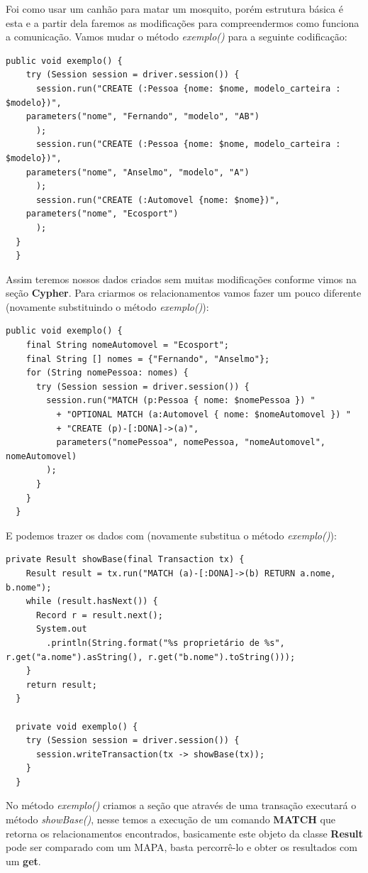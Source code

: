 Foi como usar um canhão para matar um mosquito, porém estrutura básica é esta e a partir dela faremos as modificações para compreendermos como funciona a comunicação. Vamos mudar o método \textit{exemplo()} para a seguinte codificação:
\begin{lstlisting}[]
  public void exemplo() {
    try (Session session = driver.session()) {
      session.run("CREATE (:Pessoa {nome: $nome, modelo_carteira : $modelo})", 
    parameters("nome", "Fernando", "modelo", "AB") 
      );
      session.run("CREATE (:Pessoa {nome: $nome, modelo_carteira : $modelo})", 
    parameters("nome", "Anselmo", "modelo", "A") 
      );
      session.run("CREATE (:Automovel {nome: $nome})", 
    parameters("nome", "Ecosport") 
      );
  }
  }
\end{lstlisting}

Assim teremos nossos dados criados sem muitas modificações conforme vimos na seção \textbf{Cypher}. Para criarmos os relacionamentos vamos fazer um pouco diferente (novamente substituindo o método \textit{exemplo()}):

\begin{lstlisting}[]
  public void exemplo() {
    final String nomeAutomovel = "Ecosport";
    final String [] nomes = {"Fernando", "Anselmo"};
    for (String nomePessoa: nomes) {
      try (Session session = driver.session()) {
        session.run("MATCH (p:Pessoa { nome: $nomePessoa }) "
          + "OPTIONAL MATCH (a:Automovel { nome: $nomeAutomovel }) "
          + "CREATE (p)-[:DONA]->(a)", 
          parameters("nomePessoa", nomePessoa, "nomeAutomovel", nomeAutomovel) 
        );
      }
    }
  }
\end{lstlisting}

E podemos trazer os dados com (novamente substitua o método \textit{exemplo()}):

\begin{lstlisting}[]
  private Result showBase(final Transaction tx) {
    Result result = tx.run("MATCH (a)-[:DONA]->(b) RETURN a.nome, b.nome");
    while (result.hasNext()) {
      Record r = result.next();
      System.out
        .println(String.format("%s proprietário de %s", r.get("a.nome").asString(), r.get("b.nome").toString()));
    }
    return result;
  }

  private void exemplo() {
    try (Session session = driver.session()) {
      session.writeTransaction(tx -> showBase(tx));
    }
  }
\end{lstlisting}

No método \textit{exemplo()} criamos a seção que através de uma transação executará o método \textit{showBase()}, nesse temos a execução de um comando \textbf{MATCH} que retorna os relacionamentos encontrados, basicamente este objeto da classe \textbf{Result} pode ser comparado com um MAPA, basta percorrê-lo e obter os resultados com um \textbf{get}.

